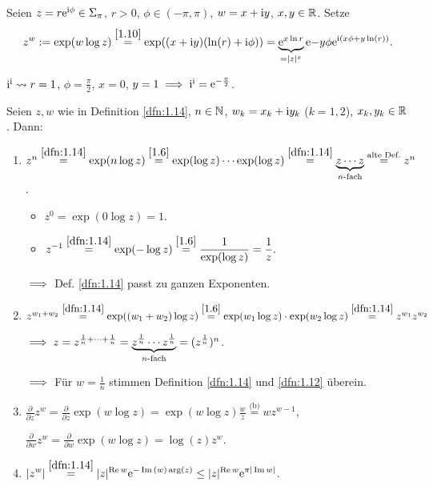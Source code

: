 \documentclass[a4paper,twoside,DIV15,BCOR12mm]{scrbook}
\begin{document}
\begin{dfn}\label{dfn:1.14}
Seien $z=r\mathrm{e}^{\mathrm{i}\phi}\in\Sigma_\pi$, $r>0$, $\phi\in(-\pi,\pi)$, $w = x+\mathrm{i} y$, $x,y\in\mathbb{R}$. Setze
\[z^w := \exp(w\log z)\stackrel{\eqref{1.10}}{=}\exp((x+\mathrm{i} y)(\ln(r)+\mathrm{i}\phi)) = \underbrace{\mathrm{e}^{x\ln r}}_{=|z|^x} \mathrm{e}{-y\phi}\mathrm{e}^{\mathrm{i}(x\phi + y\ln(r))}.\]
\end{dfn}

\begin{bsp*}
$\mathrm{i}^{\mathrm{i}} \leadsto r = 1$, $\phi = \frac{\pi}{2}$, $x =0$, $y=1 \implies \mathrm{i}^{\mathrm{i}} = \mathrm{e}^{-\frac{\pi}{2}}$.
\end{bsp*}

\begin{bem}\label{bem:1.15}
Seien $z,w$ wie in Definition \ref{dfn:1.14}, $n\in\mathbb{N}$, $w_k=x_k+\mathrm{i} y_k$ ($k=1,2$), $x_k,y_k\in\mathbb{R}$. Dann:
\begin{enumerate}
\item $z^n \stackrel{\ref{dfn:1.14}}{=} \exp (n \log z) \stackrel{\eqref{1.6}}{=} \exp(\log z)\dotsm\exp(\log z) \stackrel{\ref{dfn:1.14}}{=} \underbrace{z\dotsm z}_{n\text{-fach}} \stackrel{\text{alte Def.}}{=} z^n$.
\begin{itemize}
\item $z^0 = \exp(0\log z) = 1$.
\item $\displaystyle z^{-1} \stackrel{\ref{dfn:1.14}}{=} \exp(-\log z) \stackrel{\eqref{1.6}}{=}\frac{1}{\exp(\log z)} = \frac{1}{z}.$
\end{itemize}
$\implies$ Def. \ref{dfn:1.14} passt zu ganzen Exponenten.

\item $z^{w_1+w_2} \stackrel{\ref{dfn:1.14}}{=} \exp((w_1+w_2)\log z) \stackrel{\eqref{1.6}}{=}\exp(w_1\log z)\cdot\exp(w_2\log z) \stackrel{\ref{dfn:1.14}}{=}z^{w_1}z^{w_2}$

$\implies z = z^{\frac{1}{n} + \dotsm + \frac{1}{n}} = \underbrace{z^{\frac{1}{n}}\dotsm z^{\frac{1}{n}}}_{n\text{-fach}} = (z^{\frac{1}{n}})^n$.

$\implies$ Für $w=\frac{1}{n}$ stimmen Definition \ref{dfn:1.14} und \ref{dfn:1.12} überein.

\item $\displaystyle \frac{\partial}{\partial z}z^w = \frac{\partial}{\partial z}\exp(w \log z) = \exp(w\log z)\frac{w}{z} \stackrel{\text{(b)}}{=}wz^{w-1}$,

$\displaystyle\frac{\partial}{\partial w} z^w = \frac{\partial}{\partial w} \exp (w\log z) = \log (z) z^w$.

\item $\displaystyle |z^w| \stackrel{\ref{dfn:1.14}}{=} |z|^{\operatorname{Re}{w}}\mathrm{e}^{-\operatorname{Im}{(w)}\arg(z)} \leq |z|^{\operatorname{Re}{w}}\mathrm{e}^{\pi|\operatorname{Im}{w}|}$.
\end{enumerate}
\end{bem}
\end{document}
